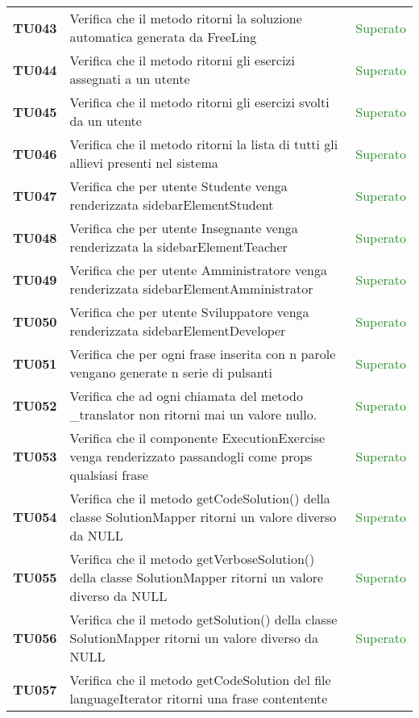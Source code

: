 \begin{tabularx}{\textwidth}{cXc}
	\textbf{TU043} & Verifica che il metodo ritorni la soluzione automatica generata da FreeLing & \textcolor{ForestGreen}{Superato} \\
	\textbf{TU044} & Verifica che il metodo ritorni gli esercizi assegnati a un utente & \textcolor{ForestGreen}{Superato} \\
	\textbf{TU045} & Verifica che il metodo ritorni gli esercizi svolti da un utente & \textcolor{ForestGreen}{Superato} \\
	\textbf{TU046} & Verifica che il metodo ritorni la lista di tutti gli allievi presenti nel sistema & \textcolor{ForestGreen}{Superato} \\
	\textbf{TU047} & Verifica che per utente Studente venga renderizzata sidebarElementStudent & \textcolor{ForestGreen}{Superato} \\
	\textbf{TU048} & Verifica che per utente Insegnante venga renderizzata la sidebarElementTeacher & \textcolor{ForestGreen}{Superato} \\
	\textbf{TU049} & Verifica che per utente Amministratore venga renderizzata sidebarElementAmministrator & \textcolor{ForestGreen}{Superato} \\
	\textbf{TU050} & Verifica che per utente Sviluppatore venga renderizzata sidebarElementDeveloper & \textcolor{ForestGreen}{Superato} \\
	\textbf{TU051} & Verifica che per ogni frase inserita con n parole vengano generate n serie di pulsanti & \textcolor{ForestGreen}{Superato} \\
	\textbf{TU052} & Verifica che ad ogni chiamata del metodo \_translator non ritorni mai un valore nullo. & \textcolor{ForestGreen}{Superato} \\
	\textbf{TU053} & Verifica che il componente ExecutionExercise venga renderizzato passandogli come props qualsiasi
	frase & \textcolor{ForestGreen}{Superato} \\
	\textbf{TU054} & Verifica che il metodo getCodeSolution() della classe SolutionMapper ritorni un valore diverso da NULL & \textcolor{ForestGreen}{Superato} \\
	\textbf{TU055} & Verifica che il metodo getVerboseSolution() della classe SolutionMapper ritorni un valore diverso da NULL & \textcolor{ForestGreen}{Superato} \\
	\textbf{TU056} & Verifica che il metodo getSolution() della classe SolutionMapper ritorni un valore diverso da NULL & \textcolor{ForestGreen}{Superato} \\
	\textbf{TU057} & Verifica che il metodo getCodeSolution del file languageIterator ritorni una frase contentente 

\end{tabularx}
